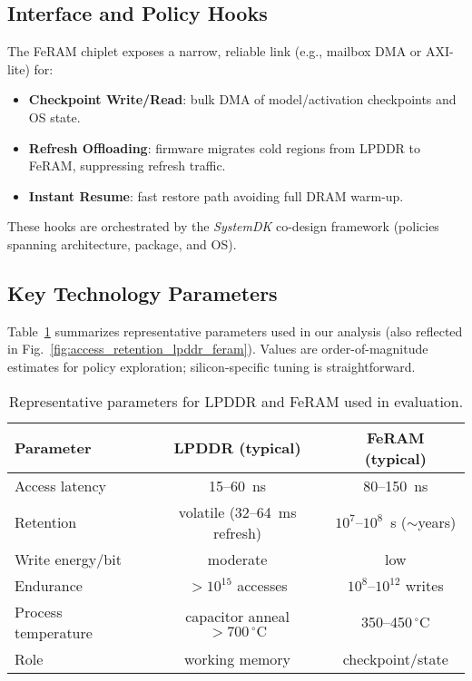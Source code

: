 

\subsection{Interface and Policy Hooks}
The FeRAM chiplet exposes a narrow, reliable link (e.g., mailbox DMA or AXI-lite) for:
\begin{itemize}
  \item \textbf{Checkpoint Write/Read}: bulk DMA of model/activation checkpoints and OS state.
  \item \textbf{Refresh Offloading}: firmware migrates cold regions from LPDDR to FeRAM, suppressing refresh traffic.
  \item \textbf{Instant Resume}: fast restore path avoiding full DRAM warm-up.
\end{itemize}
These hooks are orchestrated by the \emph{SystemDK} co-design framework (policies spanning architecture, package, and OS).

\subsection{Key Technology Parameters}
Table~\ref{tab:tech_params} summarizes representative parameters used in our analysis (also reflected in Fig.~\ref{fig:access_retention_lpddr_feram}).
Values are order-of-magnitude estimates for policy exploration; silicon-specific tuning is straightforward.

\begin{table}[t]
  \centering
  \caption{Representative parameters for LPDDR and FeRAM used in evaluation.}
  \label{tab:tech_params}
  \vspace{2pt}
  \small
  \setlength{\tabcolsep}{5pt}
  \begin{tabular}{@{}lcc@{}}
    \toprule
    Parameter & LPDDR (typical) & FeRAM (typical) \\
    \midrule
    Access latency & 15--60~ns & 80--150~ns \\
    Retention & volatile (32--64~ms refresh) & $10^7$--$10^8$~s ($\sim$years) \\
    Write energy/bit & moderate & low \\
    Endurance & $>10^{15}$ accesses & $10^8$--$10^{12}$ writes \\
    Process temperature & capacitor anneal $>700\,^\circ\mathrm{C}$ & 350--450$\,^\circ\mathrm{C}$ \\
    Role & working memory & checkpoint/state \\
    \bottomrule
  \end{tabular}
\end{table}
